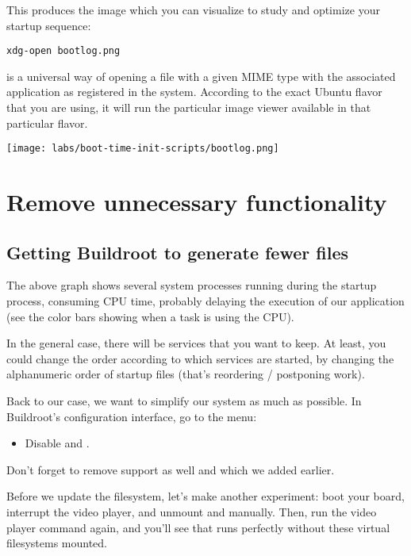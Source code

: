 This produces the  image which you can visualize to
study and optimize your startup sequence:

\begin{verbatim}
xdg-open bootlog.png
\end{verbatim}

 is a universal way of opening a file with a given MIME
type with the associated application as registered in the system.
According to the exact Ubuntu flavor that you are using,
it will run the particular image viewer available in that
particular flavor.

\begin{center}
\texttt{[image: labs/boot-time-init-scripts/bootlog.png]}
\end{center}

\section{Remove unnecessary functionality}

\subsection{Getting Buildroot to generate fewer files}

The above graph shows several system processes running
during the startup process, consuming CPU time, probably delaying
the execution of our application (see the color bars showing when
a task is using the CPU).

In the general case, there will be services that you want to keep. At
least, you could change the order according to which services are
started, by changing the alphanumeric order of startup files (that's
reordering / postponing work).

Back to our case, we want to simplify our system as much as possible.
In Buildroot's configuration interface, go to the  menu:

\begin{itemize}
\item Disable  and
      .
\end{itemize}

Don't forget to remove  support as well and
 which we added earlier.

Before we update the filesystem, let's make another experiment: boot
your board, interrupt the video player, and unmount  and
 manually. Then, run the video player command again, and
you'll see that  runs perfectly without these virtual
filesystems mounted.

